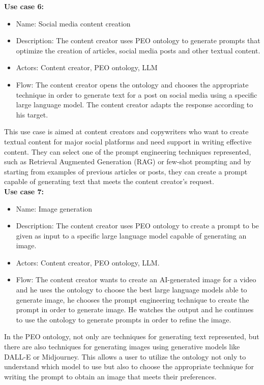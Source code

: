 \textbf{Use case 6:}
\begin{itemize}
    \item Name: Social media content creation
    \item Description: The content creator uses PEO ontology to generate prompts that optimize the creation of articles, social media posts and other textual content.
    \item Actors:  Content creator, PEO ontology, LLM
    \item Flow: The content creator opens the ontology and chooses the appropriate technique in order to generate text for a post on social media using a specific large language model. The content creator adapts the response according to his target.
\end{itemize}
This use case is aimed at content creators and copywriters who want to create textual content for major social platforms and need support in writing effective content. They can select one of the prompt engineering techniques represented, such as Retrieval Augmented Generation (RAG) or few-shot prompting and by starting from examples of previous articles or posts, they can create a prompt capable of generating text that meets the content creator's request.\\

\textbf{Use case 7:}
\begin{itemize}
    \item Name: Image generation
    \item Description: The content creator uses PEO ontology to create a prompt to be given as input to a specific large language model capable of generating an image.
    \item Actors: Content creator, PEO ontology, LLM.
    \item Flow: The content creator wants to create an AI-generated image for a video and he uses the ontology to choose the best large language models able to generate image, he chooses the prompt engineering technique to create the prompt in order to generate image. He watches the output and he continues to use the ontology to generate prompts in order to refine the image.
\end{itemize}
In the PEO ontology, not only are techniques for generating text represented, but there are also techniques for generating images using generative models like DALL-E or Midjourney. This allows a user to utilize the ontology not only to understand which model to use but also to choose the appropriate technique for writing the prompt to obtain an image that meets their preferences.\\

